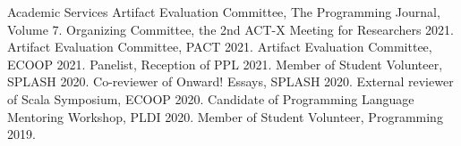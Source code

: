 \begin{rubric}{Academic Services}
  \entry*[2022] Artifact Evaluation Committee, The Programming Journal, Volume 7.
  \entry*[2021] Organizing Committee, the 2nd ACT-X Meeting for Researchers 2021.
  \entry*[2021] Artifact Evaluation Committee, PACT 2021.
  \entry*[2021] Artifact Evaluation Committee, ECOOP 2021.
  \entry*[2021] Panelist, Reception of PPL 2021.
  \entry*[2020] Member of Student Volunteer, SPLASH 2020.
  \entry*[2020] Co-reviewer of Onward! Essays, SPLASH 2020.
  \entry*[2020] External reviewer of Scala Symposium, ECOOP 2020.
  \entry*[2020] Candidate of Programming Language Mentoring Workshop, PLDI 2020.
  \entry*[2019] Member of Student Volunteer, Programming 2019.
\end{rubric}